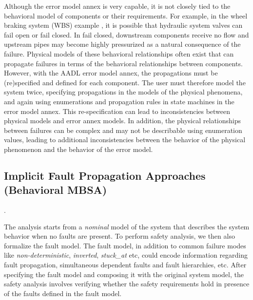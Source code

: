 Although the error model annex is very capable, it is not closely tied to the behavioral model of components or their requirements. For example, in the wheel braking system (WBS) example \cite{AIR6110}, it is possible that hydraulic system valves can fail open or fail closed. In fail closed, downstream components receive no flow and upstream pipes may become highly pressurized as a natural consequence of the failure. Physical models of these behavioral relationships often exist that can propagate failures in terms of the behavioral relationships between components. However, with the AADL error model annex, the propagations must be (re)specified and defined for each component. The user must therefore model the system twice, specifying propagations in the models of the physical phenomena, and again using enumerations and propagation rules in state machines in the error model annex. This re-specification can lead to inconsistencies between physical models and error annex models. In addition, the physical relationships between failures can be complex and may not be describable using enumeration values, leading to additional inconsistencies between the behavior of the physical phenomenon and the behavior of the error model.


\subsection{Implicit Fault Propagation Approaches (Behavioral MBSA)}

.

The analysis starts from a {\em nominal} model of the system that describes the system behavior when no faults are present.  To perform safety analysis, we then also formalize the fault model. The fault model, in addition to common failure modes like \emph{non-deterministic}, \emph{inverted}, \emph{stuck\_at} etc, could encode information
regarding fault propagation, simultaneous dependent faults and fault hierarchies, etc.
After specifying the fault model and composing it with the original system model, the safety analysis involves verifying whether the safety requirements hold in presence of the faults defined in the fault model.


